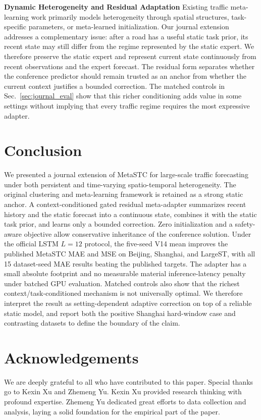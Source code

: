 \documentclass[lettersize,journal]{IEEEtran}
\begin{document}
\textbf{Dynamic Heterogeneity and Residual Adaptation}
Existing traffic meta-learning work primarily models heterogeneity through spatial structures, task-specific parameters, or meta-learned initialization. Our journal extension addresses a complementary issue: after a road has a useful static task prior, its recent state may still differ from the regime represented by the static expert. We therefore preserve the static expert and represent current state continuously from recent observations and the expert forecast. The residual form separates whether the conference predictor should remain trusted as an anchor from whether the current context justifies a bounded correction. The matched controls in Sec.~\ref{sec:journal_eval} show that this richer conditioning adds value in some settings without implying that every traffic regime requires the most expressive adapter.

\section{Conclusion}
We presented a journal extension of MetaSTC for large-scale traffic forecasting under both persistent and time-varying spatio-temporal heterogeneity. The original clustering and meta-learning framework is retained as a strong static anchor. A context-conditioned gated residual meta-adapter summarizes recent history and the static forecast into a continuous state, combines it with the static task prior, and learns only a bounded correction. Zero initialization and a safety-aware objective allow conservative inheritance of the conference solution. Under the official LSTM $L=12$ protocol, the five-seed V14 mean improves the published MetaSTC MAE and MSE on Beijing, Shanghai, and LargeST, with all 15 dataset-seed MAE results beating the published targets. The adapter has a small absolute footprint and no measurable material inference-latency penalty under batched GPU evaluation. Matched controls also show that the richest context/task-conditioned mechanism is not universally optimal. We therefore interpret the result as setting-dependent adaptive correction on top of a reliable static model, and report both the positive Shanghai hard-window case and contrasting datasets to define the boundary of the claim.

\section{Acknowledgements}

We are deeply grateful to all who have contributed to this paper. Special thanks go to Kexin Xu and Zhemeng Yu. Kexin Xu provided research thinking with profound expertise. Zhemeng Yu dedicated great efforts to data collection and analysis, laying a solid foundation for the empirical part of the paper.
\end{document}
